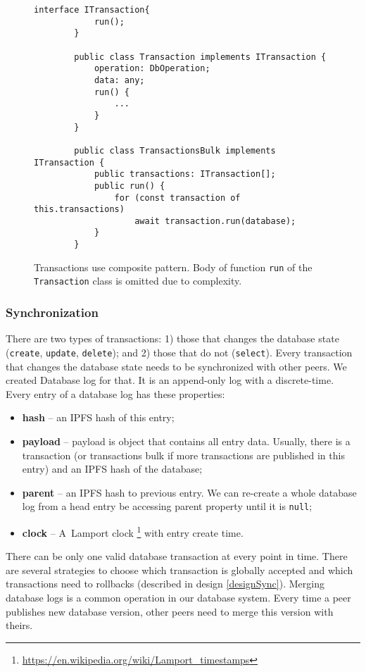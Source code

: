 \begin{figure}[h]
    \centering
    \begin{lstlisting}[style=ES6]
        interface ITransaction{
            run();
        }
        
        public class Transaction implements ITransaction {
            operation: DbOperation;
            data: any;
            run() {
                ...
            }
        }
        
        public class TransactionsBulk implements ITransaction {
            public transactions: ITransaction[];
            public run() {
                for (const transaction of this.transactions)
                    await transaction.run(database);
            }
        }
    \end{lstlisting}
    \caption{Transactions use composite pattern. Body of function \texttt{run} of the \texttt{Transaction} class is omitted due to complexity.}
    \label{transactionsComposite}
\end{figure}


\subsubsection{Synchronization}
There are two types of transactions: 1) those that changes the database state (\texttt{create}, \texttt{update}, \texttt{delete}); and 2) those that do not (\texttt{select}). Every transaction that changes the database state needs to be synchronized with other peers. We created Database log for that. It is an append-only log with a discrete-time. Every entry of a database log has these properties:
\begin{itemize}
    \item \textbf{hash} -- an IPFS hash of this entry;
    \item \textbf{payload} -- payload is object that contains all entry data. Usually, there is a transaction (or transactions bulk if more transactions are published in this entry) and an IPFS hash of the database;
    \item \textbf{parent} -- an IPFS hash to previous entry. We can re-create a whole database log from a head entry be accessing parent property until it is \texttt{null};
    \item \textbf{clock} -- A~Lamport clock \footnote{\url{https://en.wikipedia.org/wiki/Lamport_timestamps}} with entry create time.
\end{itemize}
There can be only one valid database transaction at every point in time. There are several strategies to choose which transaction is globally accepted and which transactions need to rollbacks (described in design \ref{designSync}). Merging database logs is a common operation in our database system. Every time a peer publishes new database version, other peers need to merge this version with theirs.

